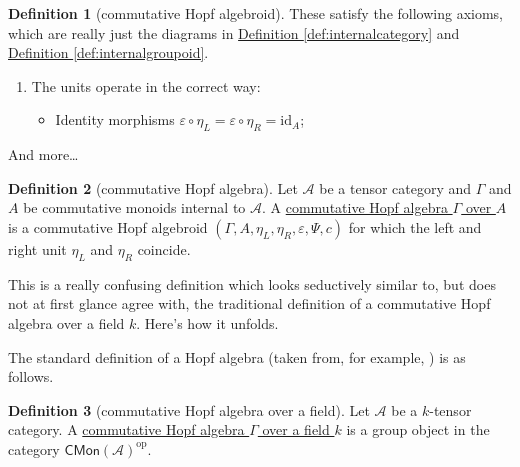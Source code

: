 \documentclass[a4paper,10pt]{scrreprt}
\newcommand{\defn}[1]{\ul{#1}}
\theoremstyle{definition}
\newtheorem{definition}{Definition}[section]
\theoremstyle{plain}
\theoremstyle{remark}
\begin{document}
\begin{definition}[commutative Hopf algebroid]
  These satisfy the following axioms, which are really just the diagrams in \hyperref[def:internalcategory]{Definition \ref*{def:internalcategory}} and \hyperref[def:internalgroupoid]{Definition \ref*{def:internalgroupoid}}.
  \begin{enumerate}
    \item The units operate in the correct way:
      \begin{itemize}
        \item Identity morphisms $\varepsilon \circ \eta_{L} = \varepsilon \circ \eta_{R} = \mathrm{id}_{A}$;
      \end{itemize}
  \end{enumerate}
  And more\dots
\end{definition}

\begin{definition}[commutative Hopf algebra]
  \label{def:commutativehopfalgebra}
  Let $\mathscr{A}$ be a tensor category and $\Gamma$ and $A$ be commutative monoids internal to $\mathscr{A}$. A \defn{commutative Hopf algebra $\Gamma$ over $A$} is a commutative Hopf algebroid $(\Gamma, A, \eta_{L}, \eta_{R}, \varepsilon, \Psi, c)$ for which the left and right unit $\eta_{L}$ and $\eta_{R}$ coincide.
\end{definition}

This is a really confusing definition which looks seductively similar to, but does not at first glance agree with, the traditional definition of a commutative Hopf algebra over a field $k$. Here's how it unfolds.

The standard definition of a Hopf algebra (taken from, for example, \cite{milne-affine-group-schemes}) is as follows.

\begin{definition}[commutative Hopf algebra over a field]
  \label{def:commutativehopfalgebraoverafield}
  Let $\mathscr{A}$ be a $k$-tensor category. A \defn{commutative Hopf algebra $\Gamma$ over a field $k$} is a group object in the category $\mathsf{CMon}(\mathscr{A})^{\mathrm{op}}$.
\end{definition}
\end{document}
